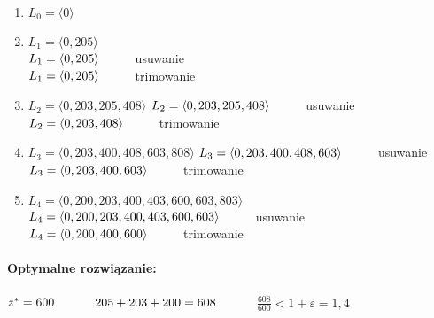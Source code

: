 \begin{enumerate}[start = 0]
\item $L_0 = \langle 0 \rangle$
\item $L_1 = \langle 0,205 \rangle$\\
	  $L_1 = \langle 0,205 \rangle\hspace*{1cm}$usuwanie\\
	  $L_1 = \langle 0,205 \rangle\hspace*{1cm}$trimowanie
\item $L_2 = \langle 0,203,205,408 \rangle$
	  $L_2 = \langle 0,203,205,408 \rangle\hspace*{1cm}$usuwanie\\
	  $L_2 = \langle 0,203,408 \rangle\hspace*{1cm}$trimowanie
\item $L_3 = \langle 0,203,400,408,603,808 \rangle$
	  $L_3 = \langle 0,203,400,408,603 \rangle\hspace*{1cm}$usuwanie\\
	  $L_3 = \langle 0,203,400,603 \rangle\hspace*{1cm}$trimowanie
\item $L_4 = \langle 0,200,203,400,403,600,603,803 \rangle$
	  $L_4 = \langle 0,200,203,400,403,600,603 \rangle\hspace*{1cm}$usuwanie\\
	  $L_4 = \langle 0,200,400,600 \rangle\hspace*{1cm}$trimowanie
\end{enumerate}
\paragraph{Optymalne rozwiązanie:}{$z^*=600\hspace*{1cm}$ $205+203+200 = 608\hspace*{1cm}$ $\frac{608}{600}<1+\varepsilon = 1,4$}